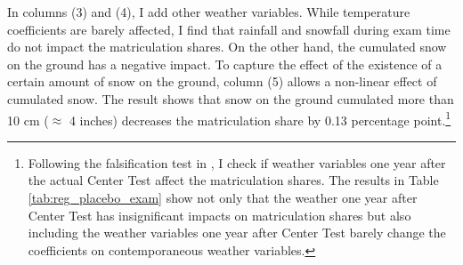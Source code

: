 \documentclass[12pt,letterpaper]{article}
\begin{document}
In columns (3) and (4), I add other weather variables.
While temperature coefficients are barely affected, I find that rainfall and snowfall during exam time do not impact the matriculation shares.
On the other hand, the cumulated snow on the ground has a negative impact.
To capture the effect of the existence of a certain amount of snow on the ground, column (5) allows a non-linear effect of cumulated snow.
The result shows that snow on the ground cumulated more than 10 cm ($\approx$ 4 inches) decreases the matriculation share by 0.13 percentage point.\footnote{
  Following the falsification test in \citet{Cho2017}, I check if weather variables one year after the actual Center Test affect the matriculation shares.
  The results in Table \ref{tab:reg_placebo_exam} show not only that the weather one year after Center Test has insignificant impacts on matriculation shares but also including the weather variables one year after Center Test barely change the coefficients on contemporaneous weather variables.
}

%  
\end{document}
